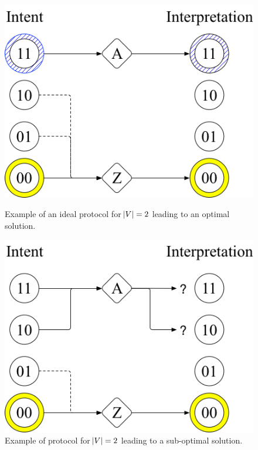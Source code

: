 \begin{figure}[H]
\centering
\begin{minipage}[t]{.5\textwidth}
  \centering
  \includegraphics[width=.85\linewidth]{imgs/protocol-2msg-good.png}
  \caption[Ideal protocol for $\abs{V} = 2$]{Example of an ideal protocol for $\abs{V} = 2$ leading to an optimal solution.}
  \label{fig:protocol-2msg-good}
\end{minipage}%
\begin{minipage}[t]{.5\textwidth}
  \centering
  \includegraphics[width=.85\linewidth]{imgs/protocol-2msg-bad.png}
  \caption[Misinterpreted protocol for $\abs{V} = 2$]{Example of protocol for $\abs{V} = 2$ leading to a sub-optimal solution.}
  \label{fig:protocol-2msg-bad}
\end{minipage}
\end{figure}

